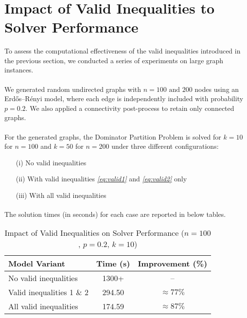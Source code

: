 \section{Impact of Valid Inequalities to Solver Performance}
\label{sec:impact_of_valid_inequalities}


\paragraph{} To assess the computational effectiveness of the valid inequalities introduced in the previous section, we conducted a series of experiments on large graph instances.

\paragraph{} We generated random undirected graphs with $n = 100 \text{ and } 200$ nodes using an Erdős–Rényi model, where each edge is independently included with probability $p = 0.2$. We also applied a connectivity post-process to retain only connected graphs.

\paragraph{} For the generated graphs, the Dominator Partition Problem is solved for $k = 10$ for $n=100$ and $k = 50$ for $n=200$ under three different configurations:
\begin{itemize}
    \item[(i)] No valid inequalities
    \item[(ii)] With valid inequalities \textsl{\eqref{eq:valid1}} and \textsl{\eqref{eq:valid2}} only
    \item[(iii)] With all valid inequalities
\end{itemize}

\paragraph{} The solution times (in seconds) for each case are reported in below tables.
\begin{table}[H]
\centering
\caption{Impact of Valid Inequalities on Solver Performance ($n=100$, $p=0.2$, $k=10$)}
\label{tab:performance1}
\begin{tabular}{l|c|c}
\textbf{Model Variant} & \textbf{Time (s)} & \textbf{Improvement (\%)} \\
\hline
No valid inequalities        & 1300+ & -- \\
Valid inequalities 1 \& 2    & 294.50 & $\approx 77 \%$ \\
All valid inequalities       & 174.59 & $\approx  87\%$ \\
\end{tabular}
\end{table}

